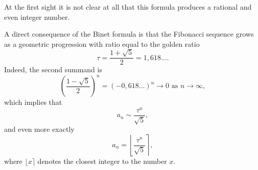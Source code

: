 
At the first sight it is not clear at all that this formula produces a rational and even integer number.

A direct consequence of the Binet formula is that the Fibonacci sequence grows as a geometric progression with ratio
equal to the golden ratio
\[
\tau = \frac{1+\sqrt{5}}2 = 1,618\ldots.
\]
Indeed, the second summand is
\[
\left(\frac{1-\sqrt{5}}2\right)^n = (-0,618\ldots)^n \to 0 \text{ as } n \to \infty,
\]
which implies that
\[
a_n \sim \frac{\tau^n}{\sqrt{5}},
\]
and even more exactly
\[
a_n = \left\lfloor \frac{\tau^n}{\sqrt{5}} \right\rceil,
\]
where $\lfloor x \rceil$ denotes the closest integer to the number $x$.

